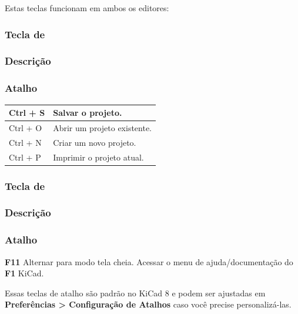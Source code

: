 Estas teclas funcionam em ambos os editores:

\hypertarget{tecla-de}{%
\subsubsection{Tecla de}\label{tecla-de}}

\hypertarget{descriuxe7uxe3o}{%
\subsubsection{Descrição}\label{descriuxe7uxe3o}}

\hypertarget{atalho}{%
\subsubsection{Atalho}\label{atalho}}

\begingroup\scriptsize\begin{longtable}[]{@{}ll@{}}
\toprule\noalign{}
Ctrl + S & Salvar o projeto. \\
\midrule\noalign{}
\endhead
\bottomrule\noalign{}
\endlastfoot
Ctrl + O & Abrir um projeto existente. \\
Ctrl + N & Criar um novo projeto. \\
Ctrl + P & Imprimir o projeto atual. \\
\end{longtable}\endgroup

\hypertarget{tecla-de-1}{%
\subsubsection{Tecla de}\label{tecla-de-1}}

\hypertarget{descriuxe7uxe3o-1}{%
\subsubsection{Descrição}\label{descriuxe7uxe3o-1}}

\hypertarget{atalho-1}{%
\subsubsection{Atalho}\label{atalho-1}}

\textbf{F11} Alternar para modo tela cheia. Acessar o menu de ajuda/documentação do \textbf{F1} KiCad.

Essas teclas de atalho são padrão no KiCad 8 e podem ser ajustadas em \textbf{Preferências \textgreater{} Configuração de Atalhos} caso você precise personalizá-las.

